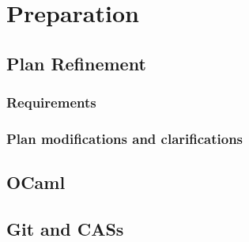 \chapter{Preparation}

\section{Plan Refinement}

\subsection{Requirements}

\subsection{Plan modifications and clarifications}

\section{OCaml}

\section{Git and CASs}
